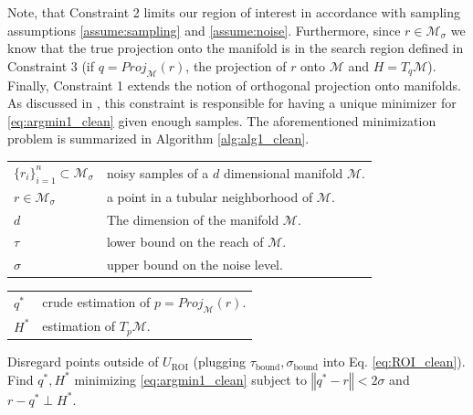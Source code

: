 \documentclass[12pt]{article}
\theoremstyle{remark}
\newcommand{\MM}{\mathcal{M}}
\newcommand{\norm}[1]{\left\Vert #1 \right\Vert}
\begin{document}
Note, that Constraint 2 limits our region of interest in accordance with sampling assumptions \ref{assume:sampling} and \ref{assume:noise}.
Furthermore, since $r\in\MM_\sigma$ we know that the true projection onto the manifold is in the search region defined in Constraint 3 (if $q=Proj_\MM(r)$, the projection of $r$ onto $\MM$ and $H= T_{q}\MM$).
Finally, Constraint 1 extends the notion of orthogonal projection onto manifolds.
As discussed in \cite{sober2016MMLS}, this constraint is responsible for having a unique minimizer for \eqref{eq:argmin1_clean} given enough samples. 
The aforementioned minimization problem is summarized in Algorithm \ref{alg:alg1_clean}.


\begin{algorithm}[H]
	\caption{Step 1: Find an initial coordinate system}
	\label{alg:alg1_clean}
	\begin{algorithmic}[1]
		\begin{tabular}[t]{ll}
			$\{r_i\}_{i=1}^n\subset \MM_\sigma$ & noisy samples of a $d$ dimensional manifold $ \MM $.\\
			$r\in \MM_\sigma$ & a point in a tubular neighborhood of $\MM$.\\
            $d$ & The dimension of the manifold $\MM$.\\
            $\tau$ & lower bound on the reach of $\MM$. \\
            $\sigma$ & upper bound on the noise level.\\
            
		\end{tabular}
		\begin{tabular}[t]{ll}
			$q^*$ & crude estimation of $p = Proj_\MM(r)$.\\
			$H^*$ & estimation of $T_p\MM$.\\
		\end{tabular}
		\State Disregard points outside of $U_{\textrm{ROI}}$ (plugging $\tau_\text{bound}, \sigma_\text{bound}$ into Eq. \eqref{eq:ROI_clean}).
		\State Find $q^*, H^*$ minimizing \eqref{eq:argmin1_clean} subject to $\norm{q^* - r}<2\sigma$ and $r - q^* \perp H^*$. 
	\end{algorithmic}
\end{algorithm}
\end{document}

